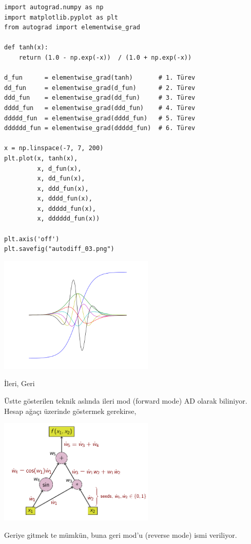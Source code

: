 \documentclass[12pt,fleqn]{article}\usepackage{../../common}
\begin{document}
\begin{verbatim}
import autograd.numpy as np
import matplotlib.pyplot as plt
from autograd import elementwise_grad

def tanh(x):
    return (1.0 - np.exp(-x))  / (1.0 + np.exp(-x))

d_fun      = elementwise_grad(tanh)       # 1. Türev
dd_fun     = elementwise_grad(d_fun)      # 2. Türev
ddd_fun    = elementwise_grad(dd_fun)     # 3. Türev
dddd_fun   = elementwise_grad(ddd_fun)    # 4. Türev
ddddd_fun  = elementwise_grad(dddd_fun)   # 5. Türev
dddddd_fun = elementwise_grad(ddddd_fun)  # 6. Türev

x = np.linspace(-7, 7, 200)
plt.plot(x, tanh(x),
         x, d_fun(x),
         x, dd_fun(x),
         x, ddd_fun(x),
         x, dddd_fun(x),
         x, ddddd_fun(x),
         x, dddddd_fun(x))

plt.axis('off')
plt.savefig("autodiff_03.png")
\end{verbatim}

\includegraphics[width=20em]{autodiff_03.png}

İleri, Geri

Üstte gösterilen teknik aslında ileri mod (forward mode) AD olarak
biliniyor. Hesap ağaçı üzerinde göstermek gerekirse,

\includegraphics[width=20em]{autodiff_04.png}

Geriye gitmek te mümkün, buna geri mod'u (reverse mode) ismi veriliyor. 
\end{document}
